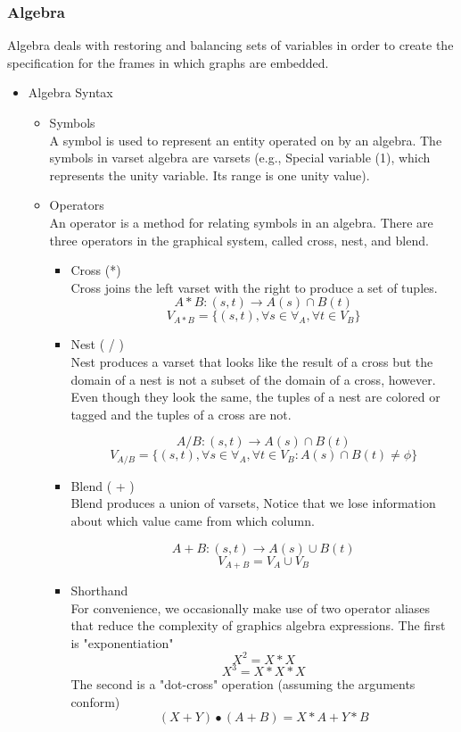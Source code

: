 \documentclass[12pt]{article}
\begin{document}
\subsubsection{Algebra}
Algebra deals with restoring and balancing sets of variables in order
to create the specification for the frames in which graphs are embedded. \\
\begin{itemize}
\item Algebra Syntax
\begin{itemize}
\item Symbols \\
A symbol is used to represent an entity operated on by an algebra. The symbols in varset algebra are varsets (e.g., Special variable (1), which represents the unity variable. Its range is one unity value). \\
\item Operators \\
An operator is a method for relating symbols in an algebra. There are three operators in the graphical system, called cross, nest, and blend.
\begin{itemize}
\item Cross (*) \\
Cross joins the left varset with the right to produce a set of tuples.  
$$ A * B :	(s,t) \longrightarrow A(s)\cap B(t) $$
$$ V_{A * B} = \lbrace(s,t) , \forall s \in \forall_{A} , \forall t \in V_{B} \rbrace $$  
\item Nest ( / ) \\
Nest produces a varset that looks like the result of a cross but the domain of a nest is not a subset of the domain of a cross, however. \\
Even though they look the same, the tuples of a nest are colored or tagged and
the tuples of a cross are not.
 
$$ A / B :	(s,t) \longrightarrow A(s)\cap B(t) $$
$$ V_{A / B} = \lbrace(s,t) , \forall s \in \forall_{A} , \forall t \in V_{B} : A(s) \cap B(t) \neq \phi \rbrace $$


\item Blend ( + ) \\
Blend produces a union of varsets, Notice that we lose information about which value came from which column.

$$ A + B :	(s,t) \longrightarrow A(s)\cup B(t) $$
$$ 	V_{A + B} =  V_{A} \cup V_{B} $$


\item Shorthand \\
For convenience, we occasionally make use of two operator aliases that reduce
the complexity of graphics algebra expressions. The first is "exponentiation"
$$ X^{2} = X * X $$
$$ X^{3} = X * X * X $$
The second is a "dot-cross" operation (assuming the arguments conform)
$$ ( X + Y ) \bullet ( A + B) = X*A + Y*B $$
\\ 
\end{itemize}
\end{itemize}
\end{itemize}
\end{document}
